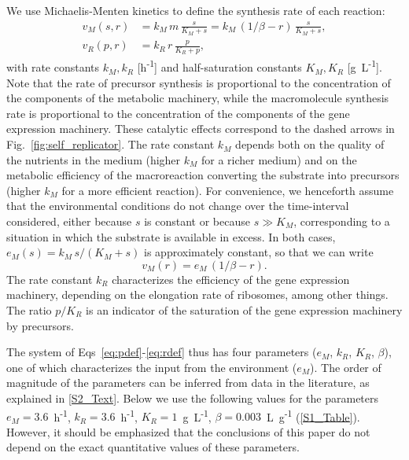 We use Michaelis-Menten kinetics to define the synthesis rate of each reaction:
\begin{align}
v_M(s,r) &= k_M\,m\, \frac{s}{K_M + s} = k_M\,(1/\beta - r)\, \frac{s}{K_M + s},  \label{eq:metaflux} \\
v_R(p,r) &= k_R\,r\, \frac{p}{K_R + p}, \label{eq:machflux}
\end{align}
with rate constants $k_M, k_R$ [h\textsuperscript{-1}] and half-saturation constants $K_M, K_R$ [g~L\textsuperscript{-1}].
Note that the rate of precursor synthesis is proportional to the concentration of the components of the metabolic machinery, while the macromolecule synthesis rate is proportional to the concentration of the components of the gene expression machinery.
These catalytic effects correspond to the dashed arrows in Fig.~\ref{fig:self_replicator}.
The rate constant $k_M$ depends both on the quality of the nutrients in the medium (higher $k_M$ for a richer medium) and on the metabolic efficiency of the macroreaction converting the substrate into precursors (higher $k_M$ for a more efficient reaction).
For convenience, we henceforth assume that the environmental conditions do not change over the time-interval considered, either because $s$ is constant or because $s \gg K_M$, corresponding to a situation in which the substrate is available in excess.
In both cases, $e_M(s) = k_M\, s/(K_M + s)$ is approximately constant, so that we can write
\begin{equation}
\label{eq:metaflux_simplified}
v_M (r) = e_M \, (1/\beta-r).
\end{equation}
The rate constant $k_R$ characterizes the efficiency of the gene expression machinery, depending on the elongation rate of ribosomes, among other things. The ratio $p/K_R$ is an indicator of the saturation of the gene expression machinery by precursors.

The system of Eqs~\ref{eq:pdef}-\ref{eq:rdef} thus has four parameters ($e_M$, $k_R$, $K_R$, $\beta$), one of which characterizes the input from the environment ($e_M$).
The order of magnitude of the parameters can be inferred from data in the literature, as explained in \ref{S2_Text}.
Below we use the following values for the parameters $e_M = 3.6$~h\textsuperscript{-1}, $k_R = 3.6$~h\textsuperscript{-1}, $K_R=1$~g~L\textsuperscript{-1}, $\beta = 0.003$~L~g\textsuperscript{-1} (\ref{S1_Table}).
However, it should be emphasized that the conclusions of this paper do not depend on the exact quantitative values of these parameters.

